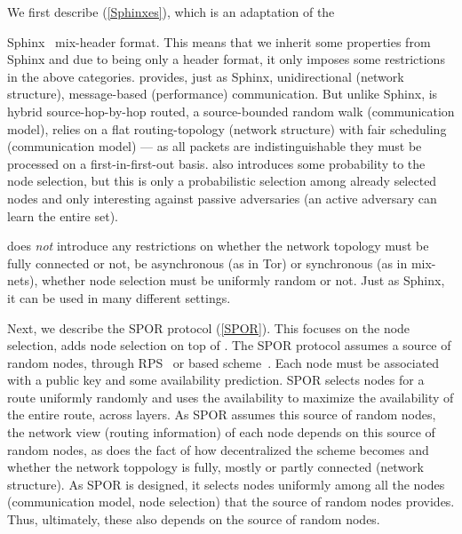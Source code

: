 We first describe \sphinxes (\cref{Sphinxes}), which is an adaptation of the 


Sphinx~\cite{Sphinx} mix-header format.
This means that we inherit some properties from Sphinx and due to being only a 
header format, it only imposes some restrictions in the above categories.
\Sphinxes provides, just as Sphinx, unidirectional (network structure), 
message-based (performance) communication.
But unlike Sphinx, \Sphinxes is hybrid source-hop-by-hop routed, a
source-bounded random walk (communication 
model),
\Sphinxes relies on a flat routing-topology (network structure) with fair 
scheduling (communication model) --- as all packets are indistinguishable they 
must be processed on a first-in-first-out basis.
\Sphinxes also introduces some probability to the node selection, but this is 
only a probabilistic selection among already selected nodes and only 
interesting against passive adversaries (an active  adversary can learn the 
entire set).

\Sphinxes does \emph{not} introduce any restrictions on whether the network 
topology must be fully connected or not, be asynchronous (as in Tor) or 
synchronous (as in mix-nets), whether node selection must be uniformly random 
or not.
Just as Sphinx, it can be used in many different settings.

Next, we describe the \ac{SPOR} protocol (\cref{SPOR}).
This focuses on the node selection, \ie adds node selection on top of \Sphinxes.
The \ac{SPOR} protocol assumes a source of random nodes, \eg through 
\ac{RPS}~\cite[\eg][]{BrahmsRPS} or  based 
scheme~\cite[\eg][]{Octopus}.
Each node must be associated with a public key and some availability 
prediction.
\Ac{SPOR} selects nodes for a route uniformly randomly and uses the 
availability to maximize the availability of the entire route, \ie across 
layers.
As \ac{SPOR} assumes this source of random nodes, the network view (routing 
information) of each node depends on this source of random nodes, as does the 
fact of how decentralized the scheme becomes and whether the network toppology 
is fully, mostly or partly connected (network structure).
As \ac{SPOR} is designed, it selects nodes uniformly among all the nodes 
(communication model, node selection) that the source of random nodes provides.
Thus, ultimately, these also depends on the source of random nodes.

